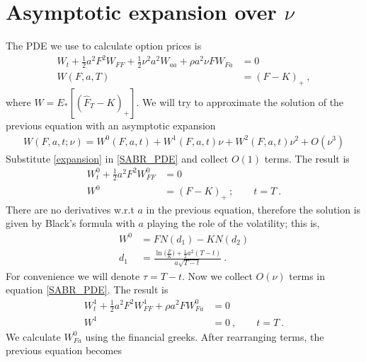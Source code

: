 \documentclass[10pt]{article}
\numberwithin{equation}{section}
\begin{document}
\section{Asymptotic expansion over $\nu$ }

The PDE we use to calculate option prices is
\begin{equation}\label{SABR_PDE}
	\begin{split}
	W_t + \frac{1}{2} a^2 F^2 W_{FF}+ \frac{1}{2} \nu^2 a^2 W_{aa}  + \rho a^2 \nu F W_{Fa}&=0\\
	W(F,a,T)&=(F-K)_{+}\:,
	\end{split}
\end{equation}
where $W=E_{*}[(\widehat{F}_{T}-K)_{+}]$. We will try to approximate the solution of the previous equation with an asymptotic expansion
\begin{equation}\label{expansion}
	\begin{split}
	W(F,a,t;\nu) = W^{0}(F,a,t) + W^{1}(F,a,t) \nu + W^{2}(F,a,t) \nu^2 + O(\nu^3)
	\end{split}
\end{equation}
Substitute \eqref{expansion} in \eqref{SABR_PDE} and collect $O(1)$ terms. The result is
\begin{equation}\label{order_0}
	\begin{split}
	W_t^{0} + \frac{1}{2}  a^2 F^2 W_{FF}^{0}&=0\\
	W^{0}&=(F-K)_{+}\:;\qquad t=T\:.
	\end{split}
\end{equation}
There are no derivatives w.r.t $a$ in the previous equation, therefore the solution is given by Black's formula with $a$ playing the role of the volatility; this is,
\begin{equation*}
	\begin{split}
	W^{0}&= FN(d_1)-KN(d_2)\\
	d_{1}&=\frac{\ln\bigl( \frac{F}{K}\bigr)+\frac{1}{2} a^2 (T-t)}{a\sqrt{T-t}}\:.
	\end{split}
\end{equation*}
For convenience we will denote $\tau = T -t$. Now we collect $O(\nu)$ terms in equation \eqref{SABR_PDE}. The result is
\begin{equation}
	\begin{split}
	W_t^{1} + \frac{1}{2}  a^2 F^2 W_{FF}^{1}+\rho a^2 F W_{Fa}^{0}&=0\\
	W^{1}&=0\:,\qquad t=T\:.
	\end{split}
\end{equation}
We calculate $W_{Fa}^{0}$ using the financial greeks. After rearranging terms, the previous equation becomes
\end{document}
